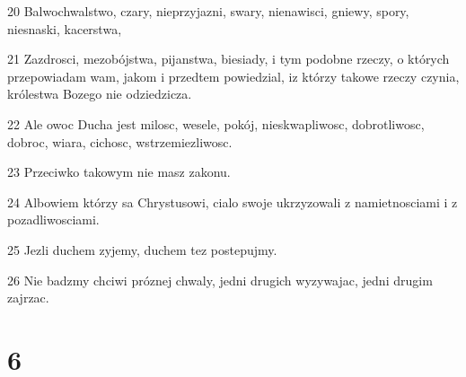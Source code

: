 \par 20 Balwochwalstwo, czary, nieprzyjazni, swary, nienawisci, gniewy, spory, niesnaski, kacerstwa,
\par 21 Zazdrosci, mezobójstwa, pijanstwa, biesiady, i tym podobne rzeczy, o których przepowiadam wam, jakom i przedtem powiedzial, iz którzy takowe rzeczy czynia, królestwa Bozego nie odziedzicza.
\par 22 Ale owoc Ducha jest milosc, wesele, pokój, nieskwapliwosc, dobrotliwosc, dobroc, wiara, cichosc, wstrzemiezliwosc.
\par 23 Przeciwko takowym nie masz zakonu.
\par 24 Albowiem którzy sa Chrystusowi, cialo swoje ukrzyzowali z namietnosciami i z pozadliwosciami.
\par 25 Jezli duchem zyjemy, duchem tez postepujmy.
\par 26 Nie badzmy chciwi próznej chwaly, jedni drugich wyzywajac, jedni drugim zajrzac.

\chapter{6}

